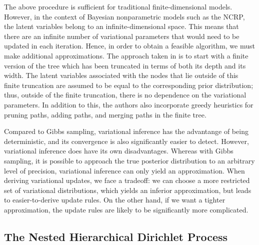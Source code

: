 \documentclass{article}
\begin{document}
The above procedure is sufficient for traditional finite-dimensional models.
However, in the context of Bayesian nonparametric models such as the NCRP, the latent variables belong to an infinite-dimensional space.
This means that there are an infinite number of variational parameters that would need to be updated in each iteration.
Hence, in order to obtain a feasible algorithm, we must make additional approximations.
The approach taken in \cite{wang2009vi_ncrp} is to start with a finite version of the tree which has been truncated in terms of both its depth and its width.
The latent variables associated with the nodes that lie outside of this finite truncation are assumed to be equal to the corresponding prior distribution; thus, outside of the finite truncation, there is no dependence on the variational parameters.
In addition to this, the authors also incorporate greedy heuristics for pruning paths, adding paths, and merging paths in the finite tree.


Compared to Gibbs sampling, variational inference has the advantange of being deterministic, and its convergence is also significantly easier to detect.
However, variational inference does have its own disadvantages.
Whereas with Gibbs sampling, it is possible to approach the true posterior distribution to an arbitrary level of precision, variational inference can only yield an approximation.
When deriving variational updates, we face a tradeoff: we can choose a more restricted set of variational distributions, which yields an inferior approximation, but leads to easier-to-derive update rules.
On the other hand, if we want a tighter approximation, the update rules are likely to be significantly more complicated.

\subsection{The Nested Hierarchical Dirichlet Process}
\end{document}
